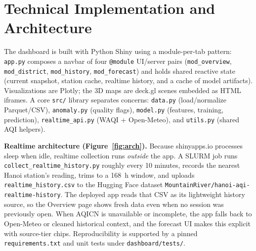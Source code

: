 \documentclass[a4paper]{article}
\begin{document}
\section{Technical Implementation and Architecture}
The dashboard is built with Python Shiny using a module-per-tab pattern: \texttt{app.py} composes a navbar
of four \texttt{@module} UI/server pairs (\texttt{mod\_overview}, \texttt{mod\_district},
\texttt{mod\_history}, \texttt{mod\_forecast}) and holds shared reactive state (current snapshot, station
cache, realtime history, and a cache of model artifacts). Visualizations are Plotly; the 3D maps are
deck.gl scenes embedded as HTML iframes. A core \texttt{src/} library separates concerns: \texttt{data.py}
(load/normalize Parquet/CSV), \texttt{anomaly.py} (quality flags), \texttt{model.py} (features, training,
prediction), \texttt{realtime\_api.py} (WAQI + Open-Meteo), and \texttt{utils.py} (shared AQI helpers).

\noindent \textbf{Realtime architecture (Figure~\ref{fig:arch}).}
Because shinyapps.io processes sleep when idle, realtime collection runs \emph{outside} the app. A SLURM
job runs \texttt{collect\_realtime\_history.py} roughly every 10 minutes, records the nearest Hanoi
station's reading, trims to a 168~h window, and uploads \texttt{realtime\_history.csv} to the Hugging Face
dataset \texttt{MountainRiver/hanoi-aqi-realtime-history}. The deployed app reads that CSV as its
lightweight history source, so the Overview page shows fresh data even when no session was previously open.
When AQICN is unavailable or incomplete, the app falls back to Open-Meteo or cleaned historical context,
and the forecast UI makes this explicit with source-tier chips. Reproducibility is supported by a pinned
\texttt{requirements.txt} and unit tests under \texttt{dashboard/tests/}.
\end{document}
